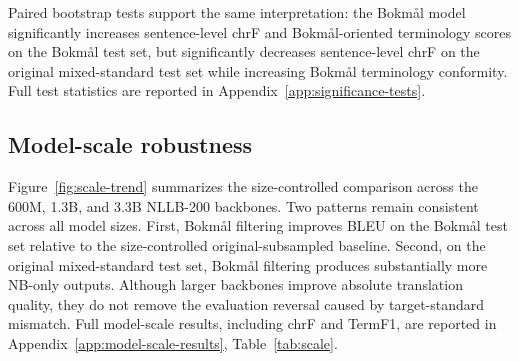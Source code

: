\documentclass[11pt]{article}
\newcommand{\nb}{Bokm{\aa}l}
\begin{document}
Paired bootstrap tests support the same interpretation: the \nb{} model significantly increases sentence-level chrF and \nb{}-oriented terminology scores on the \nb{} test set, but significantly decreases sentence-level chrF on the original mixed-standard test set while increasing \nb{} terminology conformity. Full test statistics are reported in Appendix~\ref{app:significance-tests}.

\subsection{Model-scale robustness}

Figure~\ref{fig:scale-trend} summarizes the size-controlled comparison across the 600M, 1.3B, and 3.3B NLLB-200 backbones. Two patterns remain consistent across all model sizes. First, \nb{} filtering improves BLEU on the \nb{} test set relative to the size-controlled original-subsampled baseline. Second, on the original mixed-standard test set, \nb{} filtering produces substantially more NB-only outputs. Although larger backbones improve absolute translation quality, they do not remove the evaluation reversal caused by target-standard mismatch. Full model-scale results, including chrF and TermF1, are reported in Appendix~\ref{app:model-scale-results}, Table~\ref{tab:scale}.
\end{document}
